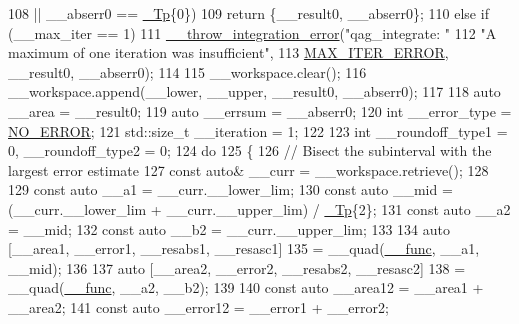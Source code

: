 \begin{DoxyCode}
108                 || \_\_abserr0 == \hyperlink{namespace____gnu__cxx_a3b19a9c800ca194374ef9172290f7d79}{\_Tp}\{0\})
109         \textcolor{keywordflow}{return} \{\_\_result0, \_\_abserr0\};
110       \textcolor{keywordflow}{else} \textcolor{keywordflow}{if} (\_\_max\_iter == 1)
111         \hyperlink{namespace____gnu__cxx_a2ae22137ca092b8ae10f4d42b4e32cfb}{\_\_throw\_integration\_error}(\textcolor{stringliteral}{"qag\_integrate: "}
112                                   \textcolor{stringliteral}{"A maximum of one iteration was insufficient"},
113                                   \hyperlink{namespace____gnu__cxx_ad6c62dd86a596716cece6ac2d4cfd4b3a420d46d10205dd953d0ccce5323afc4c}{MAX\_ITER\_ERROR}, \_\_result0, \_\_abserr0);
114 
115       \_\_workspace.clear();
116       \_\_workspace.append(\_\_lower, \_\_upper, \_\_result0, \_\_abserr0);
117 
118       \textcolor{keyword}{auto} \_\_area = \_\_result0;
119       \textcolor{keyword}{auto} \_\_errsum = \_\_abserr0;
120       \textcolor{keywordtype}{int} \_\_error\_type = \hyperlink{namespace____gnu__cxx_ad6c62dd86a596716cece6ac2d4cfd4b3ac31eecc280b10dec2efb4a2216ccc2e0}{NO\_ERROR};
121       std::size\_t \_\_iteration = 1;
122 
123       \textcolor{keywordtype}{int} \_\_roundoff\_type1 = 0, \_\_roundoff\_type2 = 0;
124       \textcolor{keywordflow}{do}
125         \{
126           \textcolor{comment}{// Bisect the subinterval with the largest error estimate}
127           \textcolor{keyword}{const} \textcolor{keyword}{auto}& \_\_curr = \_\_workspace.retrieve();
128 
129           \textcolor{keyword}{const} \textcolor{keyword}{auto} \_\_a1 = \_\_curr.\_\_lower\_lim;
130           \textcolor{keyword}{const} \textcolor{keyword}{auto} \_\_mid = (\_\_curr.\_\_lower\_lim + \_\_curr.\_\_upper\_lim) / \hyperlink{namespace____gnu__cxx_a3b19a9c800ca194374ef9172290f7d79}{\_Tp}\{2\};
131           \textcolor{keyword}{const} \textcolor{keyword}{auto} \_\_a2 = \_\_mid;
132           \textcolor{keyword}{const} \textcolor{keyword}{auto} \_\_b2 = \_\_curr.\_\_upper\_lim;
133 
134           \textcolor{keyword}{auto} [\_\_area1, \_\_error1, \_\_resabs1, \_\_resasc1]
135             = \_\_quad(\hyperlink{namespace____gnu__cxx_af2b2f0c7a2ae72b922b1afefae5a65b2}{\_\_func}, \_\_a1, \_\_mid);
136 
137           \textcolor{keyword}{auto} [\_\_area2, \_\_error2, \_\_resabs2, \_\_resasc2]
138             = \_\_quad(\hyperlink{namespace____gnu__cxx_af2b2f0c7a2ae72b922b1afefae5a65b2}{\_\_func}, \_\_a2, \_\_b2);
139 
140           \textcolor{keyword}{const} \textcolor{keyword}{auto} \_\_area12 = \_\_area1 + \_\_area2;
141           \textcolor{keyword}{const} \textcolor{keyword}{auto} \_\_error12 = \_\_error1 + \_\_error2;

\end{DoxyCode}
